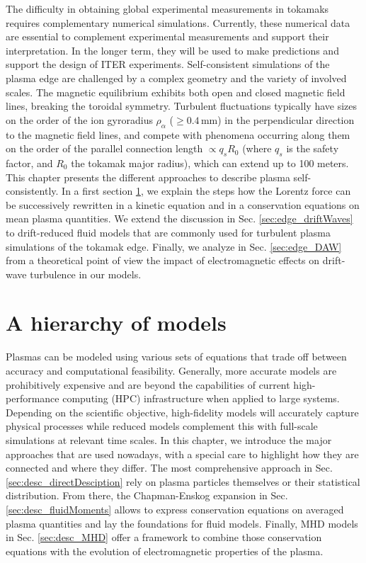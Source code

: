 The difficulty in obtaining global experimental measurements in tokamaks requires complementary numerical simulations. Currently, these numerical data are essential to complement experimental measurements and support their interpretation. In the longer term, they will be used to make predictions and support the design of ITER experiments. Self-consistent simulations of the plasma edge are challenged by a complex geometry and the variety of involved scales. The magnetic equilibrium exhibits both open and closed magnetic field lines, breaking the toroidal symmetry. Turbulent fluctuations typically have sizes on the order of the ion gyroradius $\rho_\alpha$ ($\ge 0.4\, \text{mm}$) \cite{hennequin2004} in the perpendicular direction to the magnetic field lines, and compete with phenomena occurring along them on the order of the parallel connection length $\propto q_s R_0$ (where $q_s$ is the safety factor, and $R_0$ the tokamak major radius), which can extend up to 100 meters. \\

This chapter presents the different approaches to describe plasma self-consistently. In a first section \ref{sec:desc_modelHierarchy}, we explain the steps how the Lorentz force can be successively rewritten in a kinetic equation and in a conservation equations on mean plasma quantities. We extend the discussion in Sec. \ref{sec:edge_driftWaves} to drift-reduced fluid models that are commonly used for turbulent plasma simulations of the tokamak edge. Finally, we analyze in Sec. \ref{sec:edge_DAW} from a theoretical point of view the impact of electromagnetic effects on drift-wave turbulence in our models. 


\section{A hierarchy of models}
\label{sec:desc_modelHierarchy}

Plasmas can be modeled using various sets of equations that trade off between accuracy and computational feasibility. Generally, more accurate models are prohibitively expensive and are beyond the capabilities of current high-performance computing (HPC) infrastructure when applied to large systems. Depending on the scientific objective, high-fidelity models will accurately capture physical processes while reduced models complement this with full-scale simulations at relevant time scales. In this chapter, we introduce the major approaches that are used nowadays, with a special care to highlight how they are connected and where they differ. The most comprehensive approach in Sec. \ref{sec:desc_directDesciption} rely on plasma particles themselves or their statistical distribution. From there, the Chapman-Enskog expansion in Sec. \ref{sec:desc_fluidMoments} allows to express conservation equations on averaged plasma quantities and lay the foundations for fluid models. Finally, MHD models in Sec. \ref{sec:desc_MHD} offer a framework to combine those conservation equations with the evolution of electromagnetic properties of the plasma. 

